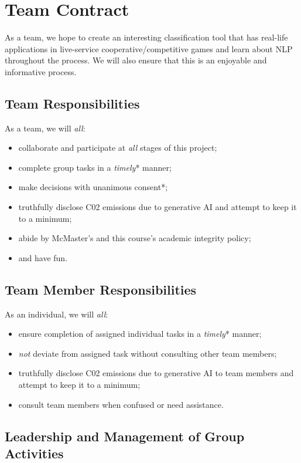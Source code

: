 \documentclass[11pt, letterpaper, notitlepage]{Article}
\begin{document}
\newpage

\section[2]{Team Contract}

As a team, we hope to create an interesting classification tool that has real-life applications in live-service cooperative/competitive games and learn about NLP throughout the process. We will also ensure that this is an enjoyable and informative process.

\subsection{Team Responsibilities}

As a team, we will \textit{all}: 
\begin{itemize}[noitemsep, nolistsep]
\item collaborate and participate at \textit{all} stages of this project;
\item complete group tasks in a \textit{timely}* manner;
\item make decisions with unanimous consent*;
\item truthfully disclose C02 emissions due to generative AI and attempt to keep it to a minimum;
\item abide by McMaster's and this course's academic integrity policy;
\item and have fun.
\end{itemize}

\subsection{Team Member Responsibilities}

As an individual, we will \textit{all}:
\begin{itemize}[noitemsep, nolistsep]
\item ensure completion of assigned individual tasks in a \textit{timely}* manner;
\item \textit{not} deviate from assigned task without consulting other team members;
\item truthfully disclose C02 emissions due to generative AI to team members and attempt to keep it to a minimum; 
\item consult team members when confused or need assistance.
\end{itemize}

\subsection{Leadership and Management of Group Activities}
\end{document}
